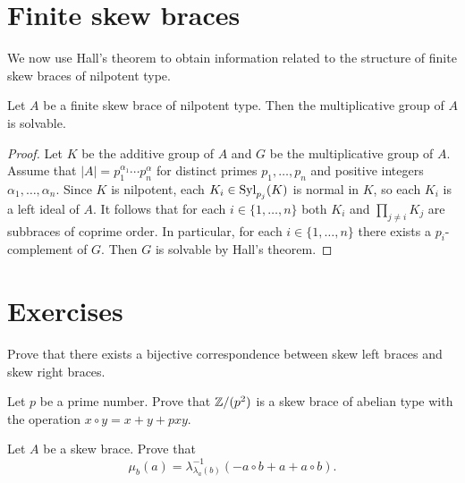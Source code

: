 \section*{Finite skew braces}

We now use Hall's theorem to obtain information related to the
structure of finite skew braces of nilpotent type. 


\begin{theorem}
\label{thm:add_nilpotent}
Let $A$ be a finite skew brace of nilpotent type. Then 
the multiplicative group of $A$ is solvable.
\end{theorem}

\begin{proof}
    Let $K$ be the additive group of $A$ and $G$ be the multiplicative group of $A$. Assume
    that $|A|=p_1^{\alpha_1}\cdots p_n^{\alpha}$ for distinct primes $p_1,\dots,p_n$ and positive integers $\alpha_1,\dots ,\alpha_n$. 
    Since $K$ is nilpotent, each $K_i\in\mathrm{Syl}_{p_j}(K)$ is normal in $K$, so 
    each $K_i$ is a left ideal of $A$. It follows that for each $i\in\{1,\dots,n\}$ both $K_i$ and 
    $\prod_{j\ne i}K_j$ are subbraces of coprime order. In particular, for 
    each $i\in\{1,\dots,n\}$ there exists a $p_i$-complement of $G$. 
    Then $G$ is solvable by Hall's theorem. 
\end{proof}

\section*{Exercises}


\begin{prob}
\label{prob:left_right}
    Prove that there exists a bijective correspondence between skew left braces and skew right braces. 
\end{prob}

\begin{prob}
Let $p$ be a prime number. Prove that $\mathbb{Z}/(p^2)$ is a skew brace of abelian type with
the operation $x\circ y=x+y+pxy$. 
\end{prob}

\begin{prob}
Let $A$ be a skew brace. 
Prove that 
\[
\mu_b(a)=\lambda^{-1}_{\lambda_a(b)}(-a\circ b+a+a\circ b).
\]
\end{prob}


